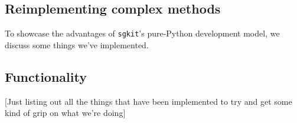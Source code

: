 \documentclass[9pt,lineno]{elife}
\newcommand{\sgkit}{\texttt{sgkit}}
\begin{document}

\subsection{Reimplementing complex methods}


To showcase the advantages of \sgkit's pure-Python development model, we
discuss some things we've implemented.


\subsection{Functionality}

[Just listing out all the things that have been implemented to try and get
some kind of grip on what we're doing]
\end{document}
